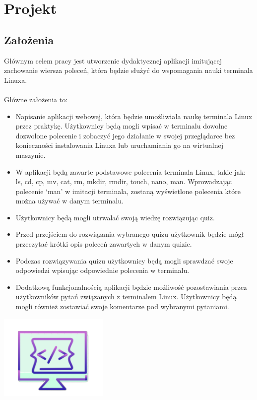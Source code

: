 \documentclass[10pt,a4paper]{report}
\begin{document}
\begin{adjustwidth}{2cm}{2cm}
\begin{minipage}{\linewidth}
\begin{center}
\end{center}
\end{minipage}
\chapter{Projekt}
\section{Założenia}
\begin{minipage}{1\linewidth}
Głównym celem pracy jest utworzenie dydaktycznej aplikacji imitującej zachowanie wiersza poleceń, która będzie służyć do wspomagania nauki terminala Linuxa. \\ \\
Główne założenia to:
\begin{itemize}
\setlength\itemsep{0.3cm}
    \item[\ding{118}] Napisanie aplikacji webowej, która będzie  umożliwiała naukę terminala Linux przez praktykę. Użytkownicy będą mogli wpisać w terminalu dowolne dozwolone polecenie i zobaczyć jego działanie w swojej przeglądarce  bez konieczności instalowania Linuxa lub uruchamiania go na wirtualnej maszynie. 
    \item[\ding{118}] W aplikacji będą zawarte podstawowe polecenia terminala Linux, takie jak: ls, cd, cp, mv, cat, rm, mkdir, rmdir, touch, nano, man. Wprowadzając polecenie ‘man’ w imitacji terminala, zostaną wyświetlone polecenia które można używać w danym terminalu.
    \item[\ding{118}] Użytkownicy będą mogli utrwalać swoją wiedzę rozwiązując quiz. 
    \item[\ding{118}] Przed przejściem do rozwiązania wybranego quizu użytkownik będzie mógł przeczytać krótki opis poleceń zawartych w danym quizie.
    \item[\ding{118}] Podczas rozwiązywania quizu użytkownicy będą mogli sprawdzać swoje odpowiedzi wpisując odpowiednie polecenia w terminalu.
    \item[\ding{118}] Dodatkową funkcjonalnością aplikacji będzie możliwość pozostawiania przez użytkowników pytań związanych z terminalem Linux. Użytkownicy będą mogli również zostawiać swoje komentarze pod wybranymi pytaniami.
\end{itemize}
\end{minipage}
 \begin{minipage}{\linewidth}
\begin{center}
  \includegraphics[width=200px]{project/logo.png} 
\end{center}
\end{minipage}

\end{adjustwidth}
\end{document}
